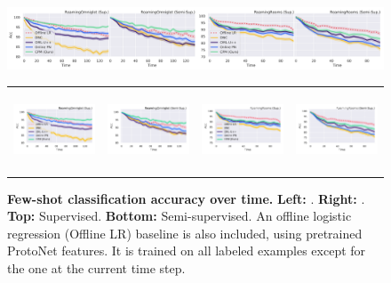 \begin{figure}[t]
\vspace{-0.5in}
\centering
\iflatexml
\includegraphics[width=6\linewidth]{figures/acctime_full.png}
\else
\setlength{\tabcolsep}{0pt}
\begin{tabular}{cccc}
\includegraphics[height=2.4cm,trim={0.3cm 0cm 0.5cm 0},clip]{figures/omniglot-nossl-time.pdf}
&
\includegraphics[height=2.4cm,trim={2cm 0cm 0cm 0},clip]{figures/omniglot-ssl-time.pdf}
&
\includegraphics[height=2.4cm,trim={1cm 0cm 0.5cm 0},clip]{figures/matterport-nossl-time.pdf}
&
\includegraphics[height=2.4cm,trim={2cm 0cm 0cm 0},clip]{figures/matterport-ssl-time.pdf}
\\
\end{tabular}
\vspace{-0.25in}
\fi
\caption{\textbf{Few-shot classification accuracy over time.} \textbf{Left:} \ourchar{}.
\textbf{Right:} \ourroom{}. \textbf{Top:} Supervised. \textbf{Bottom:} Semi-supervised. An offline
logistic regression (Offline LR) baseline is also included, using pretrained ProtoNet features. It
is trained on all labeled examples except for the one at the current time step.}
\label{fig:acctimefull}
\end{figure}
